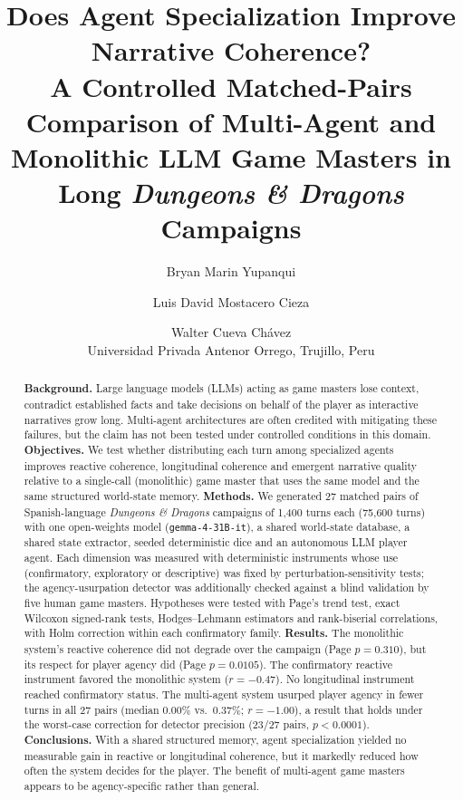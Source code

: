 \documentclass[11pt]{article}
\title{Does Agent Specialization Improve Narrative Coherence?\\A Controlled Matched-Pairs Comparison of Multi-Agent and Monolithic LLM Game Masters in Long \textit{Dungeons \& Dragons} Campaigns}
\author{Bryan Marin Yupanqui \and Luis David Mostacero Cieza \and Walter Cueva Ch\'avez\\[2pt]
\small Universidad Privada Antenor Orrego, Trujillo, Peru}
\date{}
\begin{document}
\maketitle

\begin{abstract}
\noindent\textbf{Background.} Large language models (LLMs) acting as game masters lose context, contradict established facts and take decisions on behalf of the player as interactive narratives grow long. Multi-agent architectures are often credited with mitigating these failures, but the claim has not been tested under controlled conditions in this domain.
\textbf{Objectives.} We test whether distributing each turn among specialized agents improves reactive coherence, longitudinal coherence and emergent narrative quality relative to a single-call (monolithic) game master that uses the same model and the same structured world-state memory.
\textbf{Methods.} We generated 27 matched pairs of Spanish-language \textit{Dungeons \& Dragons} campaigns of 1{,}400 turns each (75{,}600 turns) with one open-weights model (\texttt{gemma-4-31B-it}), a shared world-state database, a shared state extractor, seeded deterministic dice and an autonomous LLM player agent. Each dimension was measured with deterministic instruments whose use (confirmatory, exploratory or descriptive) was fixed by perturbation-sensitivity tests; the agency-usurpation detector was additionally checked against a blind validation by five human game masters. Hypotheses were tested with Page's trend test, exact Wilcoxon signed-rank tests, Hodges--Lehmann estimators and rank-biserial correlations, with Holm correction within each confirmatory family.
\textbf{Results.} The monolithic system's reactive coherence did not degrade over the campaign (Page $p=0.310$), but its respect for player agency did (Page $p=0.0105$). The confirmatory reactive instrument favored the monolithic system ($r=-0.47$). No longitudinal instrument reached confirmatory status. The multi-agent system usurped player agency in fewer turns in all 27 pairs (median 0.00\% vs.\ 0.37\%; $r=-1.00$), a result that holds under the worst-case correction for detector precision (23/27 pairs, $p<0.0001$).
\textbf{Conclusions.} With a shared structured memory, agent specialization yielded no measurable gain in reactive or longitudinal coherence, but it markedly reduced how often the system decides for the player. The benefit of multi-agent game masters appears to be agency-specific rather than general.
\end{abstract}
\end{document}
